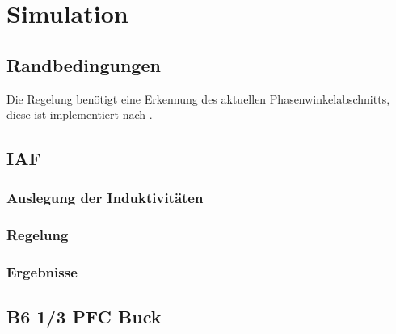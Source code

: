 \chapter{Simulation}

\section{Randbedingungen}

Die Regelung benötigt eine Erkennung des aktuellen Phasenwinkelabschnitts, diese ist implementiert nach \cite{InstituteofElectricalandElectronicsEngineers}.

\section{IAF}

\cite{IAF99}

\subsection{Auslegung der Induktivitäten }
\subsection{Regelung}

\subsection{Ergebnisse}


\section{B6 1/3 PFC Buck}